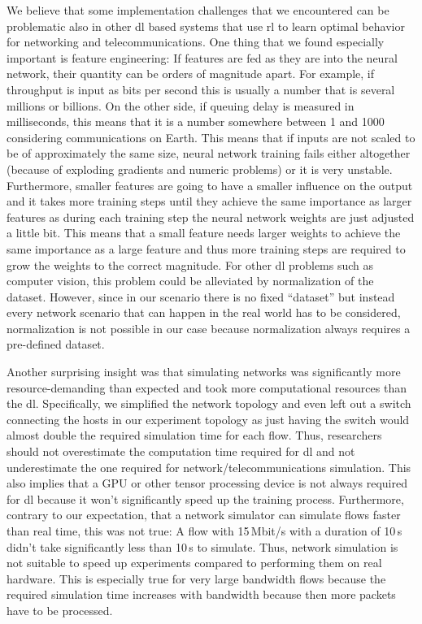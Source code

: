 \documentclass[conference]{IEEEtran}
\begin{document}
We believe that some implementation challenges that we encountered can be problematic also in other \gls{dl} based systems that use \gls{rl} to learn optimal behavior for networking and telecommunications. One thing that we found especially important is feature engineering: If features are fed as they are into the neural network, their quantity can be orders of magnitude apart. For example, if throughput is input as bits per second this is usually a number that is several millions or billions. On the other side, if queuing delay is measured in milliseconds, this means that it is a number somewhere between 1 and 1000 considering communications on Earth. This means that if inputs are not scaled to be of approximately the same size, neural network training fails either altogether (because of exploding gradients and numeric problems) or it is very unstable. Furthermore, smaller features are going to have a smaller influence on the output and it takes more training steps until they achieve the same importance as larger features as during each training step the neural network weights are just adjusted a little bit. This means that a small feature needs larger weights to achieve the same importance as a large feature and thus more training steps are required to grow the weights to the correct magnitude. For other \gls{dl} problems such as computer vision, this problem could be alleviated by normalization of the dataset. However, since in our scenario there is no fixed ``dataset'' but instead every network scenario that can happen in the real world has to be considered, normalization is not possible in our case because normalization always requires a pre-defined dataset. 

Another surprising insight was that simulating networks was significantly more resource-demanding than expected and took more computational resources than the \gls{dl}. Specifically, we simplified the network topology and even left out a switch connecting the hosts in our experiment topology as just having the switch would almost double the required simulation time for each flow. Thus, researchers should not overestimate the computation time required for \gls{dl} and not underestimate the one required for network/telecommunications simulation. This also implies that a GPU or other tensor processing device is not always required for \gls{dl} because it won't significantly speed up the training process. Furthermore, contrary to our expectation, that a network simulator can simulate flows faster than real time, this was not true: A flow with 15\,Mbit/s with a duration of 10\,s didn't take significantly less than 10\,s to simulate. Thus, network simulation is not suitable to speed up experiments compared to performing them on real hardware. This is especially true for very large bandwidth flows because the required simulation time increases with bandwidth because then more packets have to be processed. 
\end{document}
